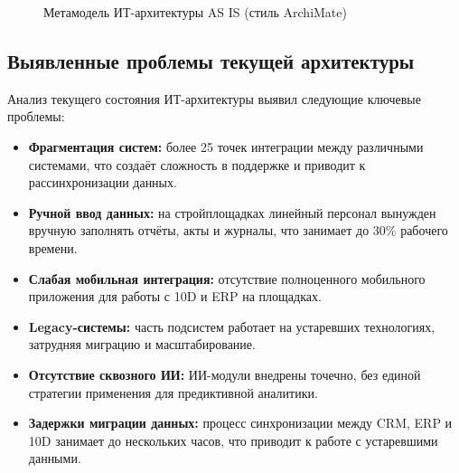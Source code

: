 \documentclass[12pt,a4paper]{article}
\begin{document}
\begin{figure}[H]
\caption{Метамодель ИТ-архитектуры AS IS (стиль ArchiMate)}
\label{fig:meta_asis}
\end{figure}

\subsection{Выявленные проблемы текущей архитектуры}

Анализ текущего состояния ИТ-архитектуры выявил следующие ключевые проблемы:

\begin{itemize}[leftmargin=20pt]
  \item \textbf{Фрагментация систем:} более 25 точек интеграции между различными системами, что создаёт сложность в поддержке и приводит к рассинхронизации данных.
  \item \textbf{Ручной ввод данных:} на стройплощадках линейный персонал вынужден вручную заполнять отчёты, акты и журналы, что занимает до 30\% рабочего времени.
  \item \textbf{Слабая мобильная интеграция:} отсутствие полноценного мобильного приложения для работы с 10D и ERP на площадках.
  \item \textbf{Legacy-системы:} часть подсистем работает на устаревших технологиях, затрудняя миграцию и масштабирование.
  \item \textbf{Отсутствие сквозного ИИ:} ИИ-модули внедрены точечно, без единой стратегии применения для предиктивной аналитики.
  \item \textbf{Задержки миграции данных:} процесс синхронизации между CRM, ERP и 10D занимает до нескольких часов, что приводит к работе с устаревшими данными.
\end{itemize}
\end{document}
